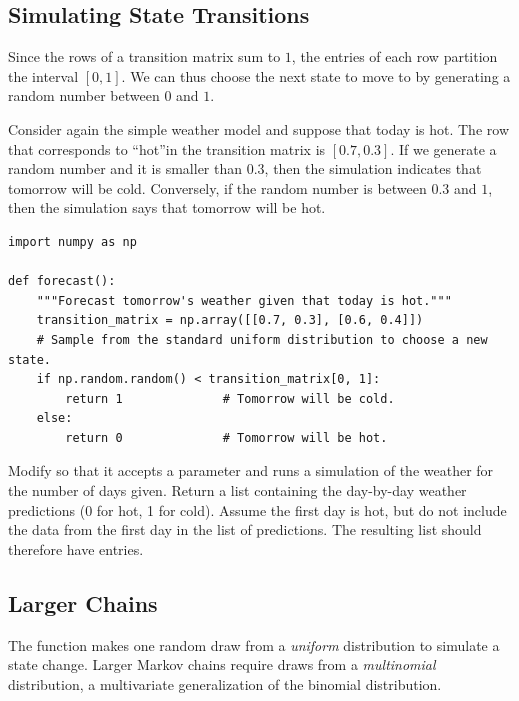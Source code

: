 \subsection*{Simulating State Transitions} %

Since the rows of a transition matrix sum to $1$, the entries of each row partition the interval $[0, 1]$.
We can thus choose the next state to move to by generating a random number between $0$ and $1$.

Consider again the simple weather model and suppose that today is hot.
The row that corresponds to ``hot''in the transition matrix is $[0.7, 0.3]$.
If we generate a random number and it is smaller than $0.3$, then the simulation indicates that tomorrow will be cold.
Conversely, if the random number is between $0.3$ and $1$, then the simulation says that tomorrow will be hot.

\begin{lstlisting}
import numpy as np

def forecast():
	"""Forecast tomorrow's weather given that today is hot."""
	transition_matrix = np.array([[0.7, 0.3], [0.6, 0.4]])
	# Sample from the standard uniform distribution to choose a new state.
	if np.random.random() < transition_matrix[0, 1]:
		return 1              # Tomorrow will be cold.
	else:
		return 0              # Tomorrow will be hot.
\end{lstlisting}

\begin{problem} %
Modify  so that it accepts a parameter  and runs a simulation of the weather for the number of days given.
Return a list containing the day-by-day weather predictions (0 for hot, 1 for cold).
Assume the first day is hot, but do not include the data from the first day in the list of predictions.
The resulting list should therefore have  entries.
\end{problem}

\subsection*{Larger Chains} %

The  function makes one random draw from a \emph{uniform} distribution to simulate a state change.
Larger Markov chains require draws from a \emph{multinomial} distribution, a multivariate generalization of the binomial distribution.

